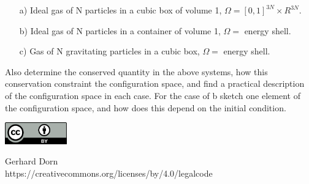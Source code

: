 \documentclass[12pt,a4paper]{article} %
\begin{document}
\begin{itemize}
	\item[a)] Ideal gas of N particles in a cubic box of volume 1, $\Omega= [0,1]^{3N}\times R^{3N}$.
	\item[b)] Ideal gas of N particles in a container of volume 1, $\Omega=$ energy shell.
	\item[c)] Gas of N gravitating particles in a cubic box, $\Omega=$ energy shell.
\end{itemize}

Also determine the conserved quantity in the above systems, how this conservation constraint the configuration space, and find a practical description of the configuration space in each case.
For the case of b sketch one element of the configuration space, and how does this depend on the initial condition.







\vspace{2cm}
\begin{minipage}[t]{1\textwidth}
	\raggedleft
	\centering
	\includegraphics[width = 0.20\textwidth]{CC-BY_icon}
	\vspace{0.2cm}
	
	\centering
	{\Large Gerhard Dorn} \\
	https://creativecommons.org/licenses/by/4.0/legalcode
\end{minipage}



  
\end{document}
